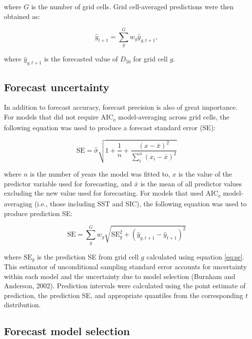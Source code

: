 \documentclass[12pt,]{book}
\theoremstyle{definition}
\theoremstyle{definition}
\theoremstyle{definition}
\theoremstyle{remark}
\begin{document}
where \(G\) is the number of grid cells. Grid cell-averaged predictions
were then obtained as:

\begin{equation}
  \hat{y}_{t+1}=\sum_g^G w_g \hat{y}_{g,t+1},
\label{eq:grid-avg-fcst}
\end{equation}

where \(\hat{y}_{g,t+1}\) is the forecasted value of \(D_{50}\) for grid
cell \(g\).

\subsection{Forecast uncertainty}\label{forecast-uncertainty}

In addition to forecast accuracy, forecast precision is also of great
importance. For models that did not require AIC\textsubscript{c}
model-averaging across grid cells, the following equation was used to
produce a forecast standard error (SE):

\begin{equation}
  \text{SE}=\hat{\sigma} \sqrt{1 + \frac{1}{n} + \frac{(x-\bar{x})^2}{\sum_i^n(x_i-\bar{x})^2}}
\label{eq:se}
\end{equation}

where \(n\) is the number of years the model was fitted to, \(x\) is the
value of the predictor variable used for forecasting, and \(\bar{x}\) is
the mean of all predictor values excluding the new value used for
forecasting. For models that used AIC\textsubscript{c} model-averaging
(i.e., those including SST and SIC), the following equation was used to
produce prediction SE:

\begin{equation}
  \text{SE}=\sum_g^G w_g \sqrt{\text{SE}_g^2+(\hat{y}_{g,t+1}-\hat{y}_{t+1})^2}
\label{eq:mod-avg-se}
\end{equation}

where \(\text{SE}_g\) is the prediction SE from grid cell \(g\)
calculated using equation \eqref{eq:se}. This estimator of unconditional
sampling standard error accounts for uncertainty within each model and
the uncertainty due to model selection (Burnham and Anderson, 2002).
Prediction intervals were calculated using the point estimate of
prediction, the prediction SE, and appropriate quantiles from the
corresponding \(t\) distribution.

\subsection{Forecast model selection}\label{model-selection}
\end{document}
